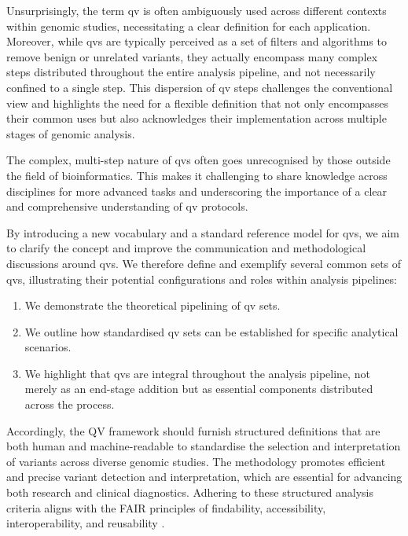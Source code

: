 Unsurprisingly, the term \ac{qv} is often ambiguously used across different contexts within genomic studies, necessitating a clear definition for each application. 
Moreover, while \ac{qv}s are typically perceived as a set of filters and algorithms to remove benign or unrelated variants, they actually encompass many complex steps distributed throughout the entire analysis pipeline, and not necessarily confined to a single step. 
This dispersion of \ac{qv} steps challenges the conventional view and highlights the need for a flexible definition that not only encompasses their common uses but also acknowledges their implementation across multiple stages of genomic analysis.

The complex, multi-step nature of \ac{qv}s often goes unrecognised by those outside the field of bioinformatics.
This makes it challenging to share knowledge across disciplines for more advanced tasks and underscoring the importance of a clear and comprehensive understanding of \ac{qv} protocols.

By introducing a new vocabulary and a standard reference model for \ac{qv}s, we aim to clarify the concept and improve the communication and methodological discussions around \ac{qv}s. 
We therefore define and exemplify several common sets of \ac{qv}s, illustrating their potential configurations and roles within analysis pipelines:

\begin{enumerate}
    \item We demonstrate the theoretical pipelining of \ac{qv} sets.
    \item We outline how standardised \ac{qv} sets can be established for specific analytical scenarios.
    \item We highlight that \ac{qv}s are integral throughout the analysis pipeline, not merely as an end-stage addition but as essential components distributed across the process.
\end{enumerate}

Accordingly, the QV framework should furnish structured definitions that are both human and machine-readable to standardise the selection and interpretation of variants across diverse genomic studies. 
The methodology promotes efficient and precise variant detection and interpretation, which are essential for advancing both research and clinical diagnostics. 
Adhering to these structured analysis criteria aligns with the FAIR principles of findability, accessibility, interoperability, and reusability \cite{wilkinson2016fair}.

